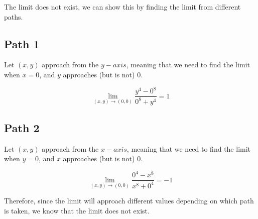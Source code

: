 \documentclass[12pt]{article} %
\begin{document}
\pagebreak

\begin{homeworkProblem}


    The limit does not exist, we can show this by finding the limit from different paths.

    \subsection*{Path 1}
    Let $(x, y)$ approach from the $y-axis$, meaning that we need to find the limit when $x = 0$, and $y$ approaches (but is not) 0.


    $$
        \lim_{(x, y) \to (0, 0)} \frac{y^4 - 0^8}{0^8 + y^4} = 1
    $$

    \subsection*{Path 2}
    Let $(x, y)$ approach from the $x-axis$, meaning that we need to find the limit when $y = 0$, and $x$ approaches (but is not) 0.

    $$
        \lim_{(x, y) \to (0, 0)} \frac{0^4 - x^8}{x^8 + 0^4} = -1
    $$

    Therefore, since the limit will approach different values depending on which path is taken, we know that the limit does not exist.


\end{homeworkProblem}

\pagebreak
\end{document}
